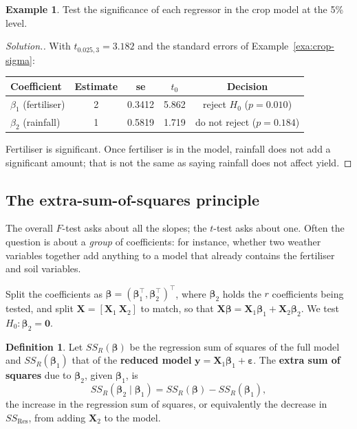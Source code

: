 \documentclass[11pt,a4paper]{article}
\numberwithin{equation}{section}
\theoremstyle{definition}
\newtheorem{defn}[thm]{Definition}
\newtheorem{exa}[thm]{Example}
\newenvironment{solution}
  {\renewcommand{\qedsymbol}{}\begin{proof}[\textit{Solution}.]}
  {\end{proof}}
\begin{document}
\begin{exa}\label{exa:crop-t}
Test the significance of each regressor in the crop model at the 5\% level.
\end{exa}

\begin{solution}
With $t_{0.025,3} = 3.182$ and the standard errors of Example~\ref{exa:crop-sigma}:
\begin{center}
\begin{tabular}{lcccc}
\hline
Coefficient & Estimate & se & $t_0$ & Decision \\
\hline
$\beta_1$ (fertiliser) & 2 & 0.3412 & 5.862 & reject $H_0$ ($p = 0.010$) \\
$\beta_2$ (rainfall) & 1 & 0.5819 & 1.719 & do not reject ($p = 0.184$) \\
\hline
\end{tabular}
\end{center}
Fertiliser is significant. Once fertiliser is in the model, rainfall does not add a
significant amount; that is not the same as saying rainfall does not affect yield.
\end{solution}

\subsection{The extra-sum-of-squares principle}\label{ssec:extra-ss}
The overall $F$-test asks about all the slopes; the $t$-test asks about one. Often the
question is about a \emph{group} of coefficients: for instance, whether two weather variables
together add anything to a model that already contains the fertiliser and soil variables.

Split the coefficients as $\boldsymbol\beta = (\boldsymbol\beta_1^\top, \boldsymbol\beta_2^\top)^\top$,
where $\boldsymbol\beta_2$ holds the $r$ coefficients being tested, and split
$\mathbf{X} = [\mathbf{X}_1 \ \mathbf{X}_2]$ to match, so that
$\mathbf{X}\boldsymbol\beta = \mathbf{X}_1\boldsymbol\beta_1 + \mathbf{X}_2\boldsymbol\beta_2$.
We test $H_0\colon \boldsymbol\beta_2 = \mathbf{0}$.

\begin{defn}
Let $SS_R(\boldsymbol\beta)$ be the regression sum of squares of the full model and
$SS_R(\boldsymbol\beta_1)$ that of the \textbf{reduced model} $\mathbf{y} = \mathbf{X}_1\boldsymbol\beta_1 + \boldsymbol\varepsilon$.
The \textbf{extra sum of squares} due to $\boldsymbol\beta_2$, given $\boldsymbol\beta_1$, is
\[
SS_R(\boldsymbol\beta_2 \mid \boldsymbol\beta_1) = SS_R(\boldsymbol\beta) - SS_R(\boldsymbol\beta_1),
\]
the increase in the regression sum of squares, or equivalently the decrease in $SS_{\mathrm{Res}}$,
from adding $\mathbf{X}_2$ to the model.
\end{defn}
\end{document}
